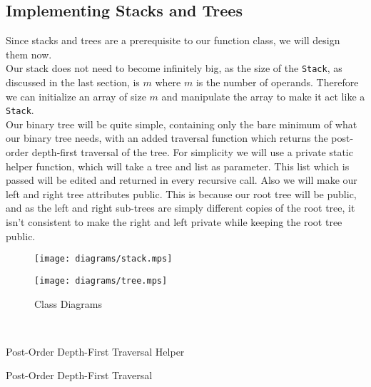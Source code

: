 \documentclass[../../../../../main.tex]{subfiles}
\begin{document}
\subsection{Implementing Stacks and Trees}
Since stacks and trees are a prerequisite to our function class, we will design them now.\\
Our stack does not need to become infinitely big, as the size of the \texttt{Stack}, as discussed in the last section, is $m$ where $m$ is the number of operands. Therefore we can initialize an array of size $m$ and manipulate the array to make it act like a \texttt{Stack}.\\
Our binary tree will be quite simple, containing only the bare minimum of what our binary tree needs, with an added traversal function which returns the post-order depth-first traversal of the tree. For simplicity we will use a private static helper function, which will take a tree and list as parameter. This list which is passed will be edited and returned in every recursive call. Also we will make our left and right tree attributes public. This is because our root tree will be public, and as the left and right sub-trees are simply different copies of the root tree, it isn't consistent to make the right and left private while keeping the root tree public.\\
\begin{figure}[h]
\centering
\begin{minipage}{.5\textwidth}
  \centering
  \texttt{[image: diagrams/stack.mps]}
\end{minipage}%
\begin{minipage}{.5\textwidth}
  \centering
  \texttt{[image: diagrams/tree.mps]}
\end{minipage}

\caption{Class Diagrams}
\end{figure}
\\
\begin{algorithm}
\caption{Post-Order Depth-First Traversal Helper}
\label{alg:traverseHelper}
\DontPrintSemicolon
{}
\end{algorithm}
\begin{algorithm}
\caption{Post-Order Depth-First Traversal}
\label{alg:traverse}
\DontPrintSemicolon
{}
\end{algorithm}

\newpage
\end{document}
